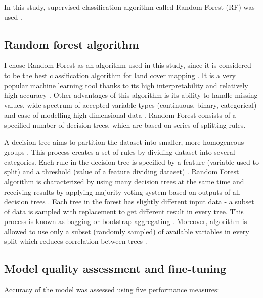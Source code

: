 \documentclass{amuthesis}
\begin{document}
In this study, supervised classification algorithm called Random Forest
(RF) was used \autocite{breiman_random_2001}.

\hypertarget{sec-rf}{%
\subsection{Random forest algorithm}\label{sec-rf}}

I chose Random Forest as an algorithm used in this study, since it is
considered to be the best classification algorithm for land cover
mapping \autocite{talukdar_land-use_2020}. It is a very popular machine
learning tool thanks to its high interpretability and relatively high
accuracy \autocite{qi_random_2012}. Other advantages of this algorithm
is its ability to handle missing values, wide spectrum of accepted
variable types (continuous, binary, categorical) and ease of modelling
high-dimensional data \autocite{qi_random_2012}. Random Forest consists
of a specified number of decision trees, which are based on series of
splitting rules.

A decision tree aims to partition the dataset into smaller, more
homogeneous groups \autocite{kuhn_applied_2013}. This process creates a
set of rules by dividing dataset into several categories. Each rule in
the decision tree is specified by a feature (variable used to split) and
a threshold (value of a feature dividing dataset)
\autocite{sekulic_random_2020}. Random Forest algorithm is characterized
by using many decision trees at the same time and receiving results by
applying majority voting system based on outputs of all decision trees
\autocite{kuhn_applied_2013}. Each tree in the forest has slightly
different input data - a subset of data is sampled with replacement to
get different result in every tree. This process is known as bagging or
bootstrap aggregating \autocite{schonlau_random_2020}. Moreover,
algorithm is allowed to use only a subset (randomly sampled) of
available variables in every split which reduces correlation between
trees \autocite{sohil_introduction_2022}.

\newpage

\hypertarget{sec-resampling}{%
\subsection{Model quality assessment and
fine-tuning}\label{sec-resampling}}

Accuracy of the model was assessed using five performance measures:
\end{document}
